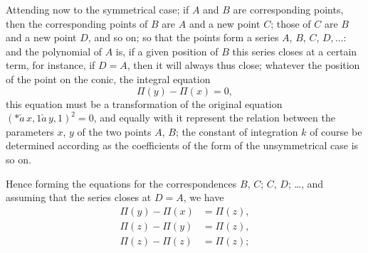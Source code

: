 \documentclass[11pt,a4paper]{article}
\theoremstyle{plain}
\theoremstyle{definition}
\begin{document}
Attending now to the symmetrical case; if $A$ and $B$ are corresponding points, then the corresponding points of $B$ are $A$ and a new point $C$; those of $C$ are $B$
and a new point $D$, and so on; so that the points form a series $A$, $B$, $C$, $D, \ldots$:
and the polynomial of $A$ is, if a given position of $B$ this series closes at a
certain term, for instance, if $D = A$, then it will always thus close; whatever the position of the point on the conic, the integral equation
\[
\Pi(y) - \Pi(x) = 0,
\]
this equation must be a transformation of the original equation $(*\!\check{a}\,x, 1\check{a}\,y, 1)^2 = 0$, and
equally with it represent the relation between the parameters $x$, $y$ of the two points
$A$, $B$; the constant of integration $k$ of course be determined according as
the coefficients of the form of the unsymmetrical case is so on.

Hence forming the equations for the correspondences $B$, $C$; $C$, $D$; \ldots, and assuming
that the series closes at $D = A$, we have
\begin{align*}
\Pi(y) - \Pi(x) &= \Pi(z), \\
\Pi(z) - \Pi(y) &= \Pi(z), \\
\Pi(z) - \Pi(z) &= \Pi(z) ;
\end{align*}

\clearpage
\end{document}
